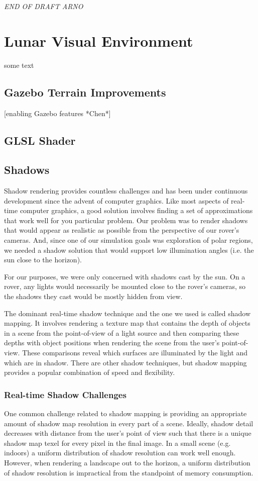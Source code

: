 \documentclass[twocolumn,letterpaper]{IEEEAerospaceCLS}  %
\begin{document}
\textit{END OF DRAFT ARNO}

\section{Lunar Visual Environment}
some text

\subsection{Gazebo Terrain Improvements}
[enabling Gazebo features *Chen*]

\subsection{GLSL Shader}

\subsection{Shadows}
Shadow rendering provides countless challenges and has been under continuous development since the advent of computer graphics. Like most aspects of real-time computer graphics, a good solution involves finding a set of approximations that work well for you particular problem. Our problem was to render shadows that would appear as realistic as possible from the perspective of our rover's cameras. And, since one of our simulation goals was exploration of polar regions, we needed a shadow solution that would support low illumination angles (i.e. the sun close to the horizon).

For our purposes, we were only concerned with shadows cast by the sun. On a rover, any lights would necessarily be mounted close to the rover's cameras, so the shadows they cast would be mostly hidden from view.

The dominant real-time shadow technique and the one we used is called shadow mapping. It involves rendering a texture map that contains the depth of objects in a scene from the point-of-view of a light source and then comparing these depths with object positions when rendering the scene from the user's point-of-view. These comparisons reveal which surfaces are illuminated by the light and which are in shadow. There are other shadow techniques, but shadow mapping provides a popular combination of speed and flexibility.

\subsubsection{Real-time Shadow Challenges}
One common challenge related to shadow mapping is providing an appropriate amount of shadow map resolution in every part of a scene. Ideally, shadow detail decreases with distance from the user's point of view such that there is a unique shadow map texel for every pixel in the final image. In a small scene (e.g. indoors) a uniform distribution of shadow resolution can work well enough. However, when rendering a landscape out to the horizon, a uniform distribution of shadow resolution is impractical from the standpoint of memory consumption.
\end{document}
